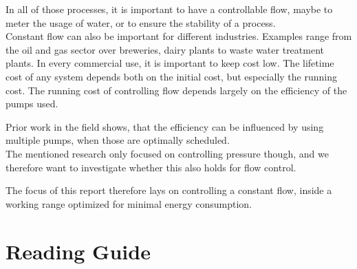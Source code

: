 In all of those processes,
it is important to have a controllable flow,
maybe to meter the usage of water,
or to ensure the stability of a process.\\
Constant flow can also be important for different industries.
Examples range from the oil and gas sector\cite{OilFlow} over breweries\cite{BrewFlow},
dairy plants\cite{DairyFlow} to waste water treatment plants\cite{WastewaterFlow}.
In every commercial use,
it is important to keep cost low.
The lifetime cost of any system depends both on the initial cost,
but especially the running cost. \cite{LifetimeCost}
The running cost of controlling flow depends largely on the efficiency of the pumps used.\cite{LifeCycleCostEfficiency}

Prior work in the field shows, that the efficiency can be influenced by using multiple pumps,
when those are optimally scheduled. \cite{YangMultiPump2008}\\
The mentioned research only focused on controlling pressure though,
and we therefore want to investigate whether this also holds for flow control.

The focus of this report therefore lays on controlling a constant flow,
inside a working range optimized for minimal energy consumption.
%
%
%
%
%
%
%
%
%
%
%
%

\section*{Reading Guide}


